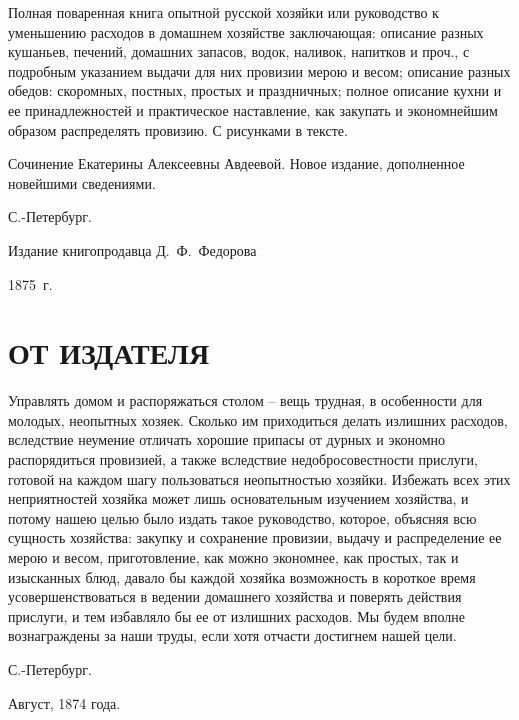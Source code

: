 Полная поваренная книга опытной русской хозяйки или руководство к уменьшению расходов в домашнем хозяйстве заключающая: описание разных кушаньев, печений, домашних запасов, водок, наливок, напитков и проч., с подробным указанием выдачи для них провизии мерою и весом; описание разных обедов: скоромных, постных, простых и праздничных; полное описание кухни и ее принадлежностей и практическое наставление, как закупать и экономнейшим образом распределять провизию.
С рисунками в тексте.

Сочинение Екатерины Алексеевны Авдеевой.
Новое издание, дополненное новейшими сведениями.

С.-Петербург.

Издание книгопродавца Д.~Ф.~Федорова

1875~г.

\newpage
\section*{ОТ ИЗДАТЕЛЯ}

Управлять домом и распоряжаться столом -- вещь трудная, в особенности для молодых, неопытных хозяек. Сколько им приходиться делать излишних расходов, вследствие неумение отличать хорошие припасы от дурных и экономно распорядиться провизией, а также вследствие недобросовестности прислуги, готовой на каждом шагу пользоваться неопытностью хозяйки. Избежать всех этих неприятностей хозяйка может лишь основательным изучением хозяйства, и потому нашею целью было издать такое руководство, которое, объясняя всю сущность хозяйства: закупку и сохранение провизии, выдачу и распределение ее мерою и весом, приготовление, как можно экономнее, как простых, так и изысканных блюд, давало бы каждой хозяйка возможность в короткое время усовершенствоваться в ведении домашнего хозяйства и поверять действия прислуги, и тем избавляло бы ее от излишних расходов. Мы будем вполне вознаграждены за наши труды, если хотя отчасти достигнем нашей цели.

С.-Петербург.

Август, 1874 года.
